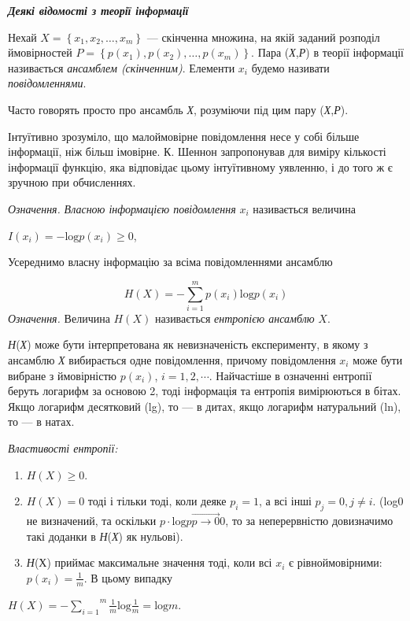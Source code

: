 {\centering\bfseries\itshape
Деякі відомості з теорії інформації
\par}

 Нехай  ${X=\left\{x_{{1}},x_{{2}},\dots,x_{{m}}\right\}}$ ---
скінченна множина, на якій заданий розподіл ймовірностей 
${P=\left\{p(x_{{1}}),p(x_{{2}}),\dots,p(x_{{m}})\right\}}$.
Пара (\textit{Х},\textit{Р}) в теорії інформації називається \textit{ансамблем
(скінченним)}. Елементи  ${x_{{i}}}$ будемо називати \textit{повідомленнями}.

 Часто говорять просто про ансамбль \textit{Х}, розуміючи під цим пару
(\textit{Х},\textit{Р}).

 Інтуїтивно зрозуміло, що малоймовірне повідомлення несе у собі  більше
інформації, ніж більш імовірне. К. Шеннон запропонував для виміру кількості
інформації функцію, яка відповідає цьому інтуїтивному уявленню, і до того ж  є
зручною при обчисленнях.

\textit{Означення.} \textit{ Власною інформацією повідомлення}  ${x_{{i}}}$
називається величина

{\centering
 ${I(x_{{i}})=-\text{log}p(x_{{i}})\ge 0}$,
\par}

 Усереднимо власну інформацію за всіма повідомленнями ансамблю

\begin{equation*}
{H(X)=-\overset{{m}}{\underset{{i=1}}{\sum }}{p(x_{{i}})\text{log}p(x_{{i}})}}
\end{equation*}
\textit{Означення.} Величина  ${H(X)}$ називається \textit{ентропією ансамблю} 
${X}$.

\textit{Н}(\textit{Х}) може бути інтерпретована як невизначеність експерименту,
в  якому  з ансамблю \textit{Х }вибирається одне повідомлення, причому
повідомлення   ${x_{{i}}}$ може бути вибране з ймовірністю ${p(x_{{i}})}$,
${i=1,2,\dotsm\text{.}}$ Найчастіше в означенні ентропії
беруть логарифм за основою 2, тоді інформація та ентропія вимірюються в бітах.
Якщо логарифм десятковий (lg), то --- в дитах, якщо логарифм натуральний (ln), то
--- в натах.


\bigskip

{\itshape
Властивості ентропії:}

\liststyleWWviiiNumxxxix
\begin{enumerate}
\item  ${H(X)\ge 0}$.
\item  ${H(X)=0}$ тоді і тільки тоді, коли деяке  ${p_{{i}}=1}$, а всі інші 
${p_{{j}}=0,j\neq i}$. (log0 не визначений, та оскільки  ${p\cdot
\text{log}p\overrightarrow{{{p\rightarrow 0}}}0}$, то за неперервністю
довизначимо такі доданки в \textit{Н}(\textit{Х}) як нульові).
\item \textit{Н}(Х) приймає максимальне значення тоді, коли всі  ${x_{{i}}}$ є
рівноймовірними:  ${p(x_{{i}})=\frac{1}{m}}$. В цьому випадку
\end{enumerate}
{\centering
 ${H(X)=-\overset{{m}}{\underset{{i=1}}{\sum
}}{\frac{{1}}{{m}}\text{log}\frac{1}{m}}=\text{log}m}$.
\par}


